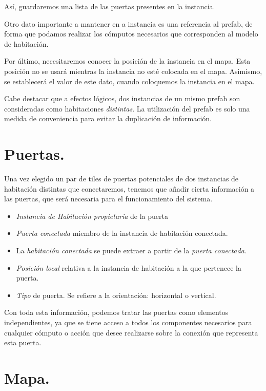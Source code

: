 Así, guardaremos una lista de las puertas presentes en la instancia.

Otro dato importante a mantener en a instancia es una referencia al prefab, de forma que podamos realizar los cómputos necesarios que corresponden al modelo de habitación.

Por último, necesitaremos conocer la posición de la instancia en el mapa. Esta posición no se usará mientras la instancia no esté colocada en el mapa. Asimismo, se establecerá el valor de este dato, cuando coloquemos la instancia en el mapa.

Cabe destacar que a efectos lógicos, dos instancias de un mismo prefab son consideradas como habitaciones \emph{distintas}. La utilización del prefab es solo una medida de conveniencia para evitar la duplicación de información.

\section{Puertas.}

Una vez elegido un par de tiles de puertas potenciales de dos instancias de habitación distintas que conectaremos, tenemos que añadir cierta información a las puertas, que será necesaria para el funcionamiento del sistema.

\begin{itemize}
	\item \emph{Instancia de Habitación propietaria} de la puerta
	\item \emph{Puerta conectada} miembro de la instancia de habitación conectada.
	\item La \emph{habitación conectada} se puede extraer a partir de la \emph{puerta conectada}.
	\item \emph{Posición local} relativa a la instancia de habitación a la que pertenece la puerta.
	\item \emph{Tipo} de puerta. Se refiere a la orientación: horizontal o vertical.
\end{itemize}

Con toda esta información, podemos tratar las puertas como elementos independientes, ya que se tiene acceso a todos los componentes necesarios para cualquier cómputo o acción que desee realizarse sobre la conexión que representa esta puerta.

\section{Mapa.}

